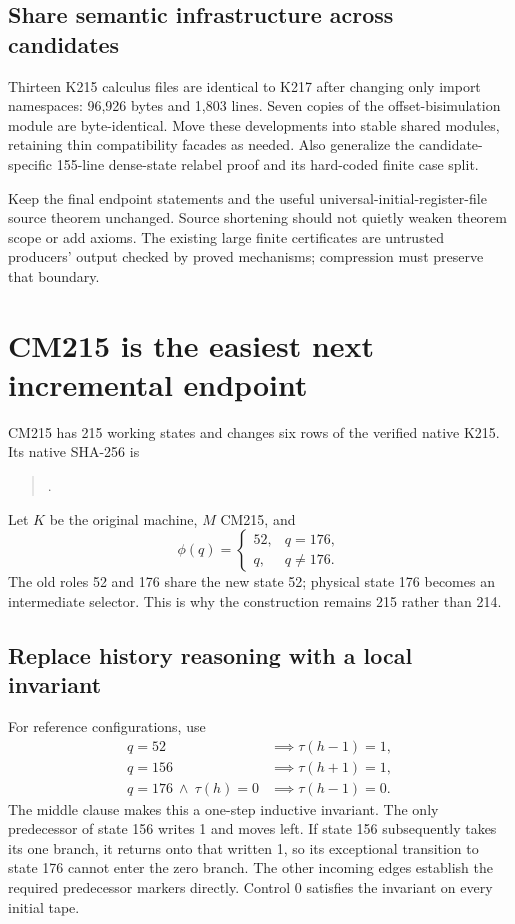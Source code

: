 \documentclass[11pt]{article}
\begin{document}
\subsection{Share semantic infrastructure across candidates}
Thirteen K215 calculus files are identical to K217 after changing only import namespaces: 96,926 bytes and 1,803 lines. Seven copies of the offset-bisimulation module are byte-identical. Move these developments into stable shared modules, retaining thin compatibility facades as needed. Also generalize the candidate-specific 155-line dense-state relabel proof and its hard-coded finite case split.

Keep the final endpoint statements and the useful universal-initial-register-file source theorem unchanged. Source shortening should not quietly weaken theorem scope or add axioms. The existing large finite certificates are untrusted producers' output checked by proved mechanisms; compression must preserve that boundary.

\section{CM215 is the easiest next incremental endpoint}
CM215 has 215 working states and changes six rows of the verified native K215. Its native SHA-256 is
\begin{quote}\small{}.\end{quote}
Let $K$ be the original machine, $M$ CM215, and
\[
 \phi(q)=\begin{cases}52,&q=176,\\q,&q\ne176.\end{cases}
\]
The old roles 52 and 176 share the new state 52; physical state 176 becomes an intermediate selector. This is why the construction remains 215 rather than 214.

\subsection{Replace history reasoning with a local invariant}
For reference configurations, use
\[
\begin{aligned}
q=52&\implies\tau(h-1)=1,\\
q=156&\implies\tau(h+1)=1,\\
q=176\ \land\ \tau(h)=0&\implies\tau(h-1)=0.
\end{aligned}
\]
The middle clause makes this a one-step inductive invariant. The only predecessor of state 156 writes 1 and moves left. If state 156 subsequently takes its one branch, it returns onto that written 1, so its exceptional transition to state 176 cannot enter the zero branch. The other incoming edges establish the required predecessor markers directly. Control 0 satisfies the invariant on every initial tape.
\end{document}
